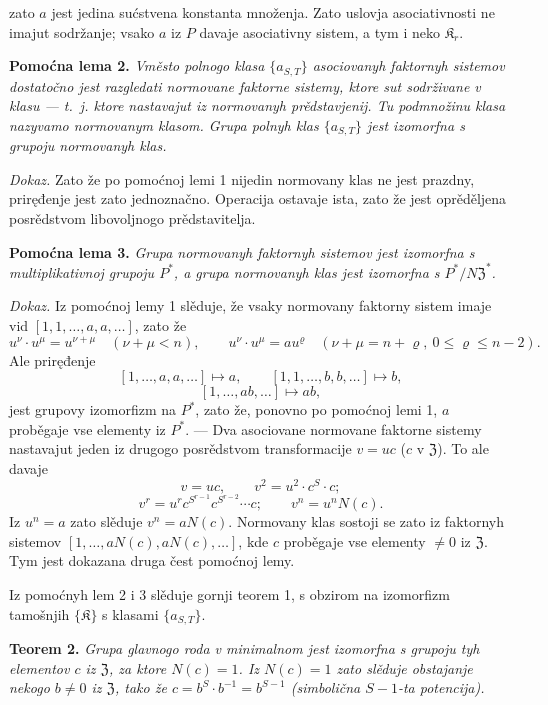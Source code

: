 \documentclass[11pt]{article}
\begin{document}
zato \(a\) jest jedina sućstvena konstanta množenja. Zato uslovja asociativnosti ne imajut sodržanje; vsako \(a\) iz \(P\) davaje asociativny sistem, a tym i neko \(\mathfrak K_r\).

\noindent\textbf{Pomoćna lema 2.} \emph{Vměsto polnogo klasa \(\{a_{S,T}\}\) asociovanyh faktornyh sistemov dostatočno jest razgledati normovane faktorne sistemy, ktore sut sodrživane v klasu --- t.~j. ktore nastavajut iz normovanyh prědstavjenij. Tu podmnožinu klasa nazyvamo normovanym klasom. Grupa polnyh klas \(\{a_{S,T}\}\) jest izomorfna s grupoju normovanyh klas.}

\noindent\emph{Dokaz.} Zato že po pomoćnoj lemi 1 nijedin normovany klas ne jest prazdny, priręđenje jest zato jednoznačno. Operacija ostavaje ista, zato že jest oprěděljena posrědstvom libovoljnogo prědstavitelja.

\noindent\textbf{Pomoćna lema 3.} \emph{Grupa normovanyh faktornyh sistemov jest izomorfna s multiplikativnoj grupoju \(P^*\), a grupa normovanyh klas jest izomorfna s \(P^*/N\mathfrak Z^*\).}

\noindent\emph{Dokaz.} Iz pomoćnoj lemy 1 slěduje, že vsaky normovany faktorny sistem imaje vid \([1,1,\ldots,a,a,\ldots]\), zato že
\[
u^\nu\cdot u^\mu=u^{\nu+\mu}\quad(\nu+\mu<n),
\qquad
u^\nu\cdot u^\mu=au^\varrho\quad(\nu+\mu=n+\varrho,\ 0\leq\varrho\leq n-2).
\]
Ale priręđenje
\[
[1,\ldots,a,a,\ldots]\mapsto a,
\qquad
[1,1,\ldots,b,b,\ldots]\mapsto b,
\]
\[
[1,\ldots,ab,\ldots]\mapsto ab,
\]
jest grupovy izomorfizm na \(P^*\), zato že, ponovno po pomoćnoj lemi 1, \(a\) proběgaje vse elementy iz \(P^*\). --- Dva asociovane normovane faktorne sistemy nastavajut jeden iz drugogo posrědstvom transformacije \(v=uc\) (\(c\) v \(\mathfrak Z\)). To ale davaje
\[
v=uc,\qquad v^2=u^2\cdot c^S\cdot c;
\]
\[
v^r=u^r c^{S^{r-1}}c^{S^{r-2}}\cdots c;
\qquad
v^n=u^nN(c).
\]
Iz \(u^n=a\) zato slěduje \(v^n=aN(c)\). Normovany klas sostoji se zato iz faktornyh sistemov \([1,\ldots,aN(c),aN(c),\ldots]\), kde \(c\) proběgaje vse elementy \(\neq0\) iz \(\mathfrak Z\). Tym jest dokazana druga čest pomoćnoj lemy.

Iz pomoćnyh lem 2 i 3 slěduje gornji teorem 1, s obzirom na izomorfizm tamošnjih \(\{\mathfrak K\}\) s klasami \(\{a_{S,T}\}\).

\noindent\textbf{Teorem 2.} \emph{Grupa glavnogo roda v minimalnom jest izomorfna s grupoju tyh elementov \(c\) iz \(\mathfrak Z\), za ktore \(N(c)=1\). Iz \(N(c)=1\) zato slěduje obstajanje nekogo \(b\neq0\) iz \(\mathfrak Z\), tako že \(c=b^S\cdot b^{-1}=b^{S-1}\) (simbolična \(S-1\)-ta potencija).}
\end{document}
